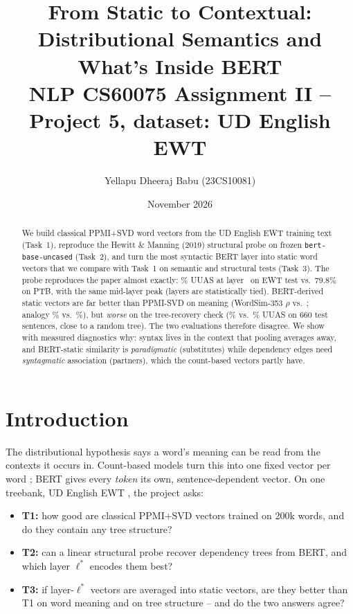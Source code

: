 \documentclass[11pt,a4paper]{article}
\title{\vspace{-1.2cm}\textbf{From Static to Contextual: Distributional Semantics and What's Inside BERT}\\[2pt]
\large NLP CS60075 Assignment II -- Project 5, dataset: UD English EWT}
\author{Yellapu Dheeraj Babu (23CS10081)}
\date{November 2026}
\newcommand{\lstar}{\ensuremath{\ell^*}}
\begin{document}
\maketitle
\vspace{-0.6cm}
\begin{abstract}
\noindent We build classical PPMI+SVD word vectors from the UD English EWT training text (Task~1), reproduce the
Hewitt \& Manning (2019) structural probe on frozen \texttt{bert-base-uncased} (Task~2), and turn the most
syntactic BERT layer into static word vectors that we compare with Task~1 on semantic and structural tests (Task~3).
The probe reproduces the paper almost exactly: \TtwoTestUuas\% UUAS at layer~\Lstar{} on EWT test vs.\ 79.8\% on PTB,
with the same mid-layer peak (layers \TiedLayers{} are statistically tied). BERT-derived static vectors are far better
than PPMI-SVD on meaning (WordSim-353 $\rho$ \TThreeWSCov{} vs.\ \TOneWSCov; analogy \TThreeANCov\% vs.\ \TOneANCov\%),
but \emph{worse} on the tree-recovery check (\TThreePool\% vs.\ \TOnePool\% UUAS on 660 test sentences, close to a random tree).
The two evaluations therefore disagree. We show with measured diagnostics why: syntax lives in the context that pooling
averages away, and BERT-static similarity is \emph{paradigmatic} (substitutes) while dependency edges need \emph{syntagmatic}
association (partners), which the count-based vectors partly have.
\end{abstract}

\section{Introduction}
The distributional hypothesis \citep{harris} says a word's meaning can be read from the contexts it occurs in. Count-based models turn
this into one fixed vector per word \citep{levy2014,levy2015}; BERT \citep{devlin} gives every \emph{token} its own, sentence-dependent
vector. On one treebank, UD English EWT \citep{silveira,ud}, the project asks:
\begin{itemize}
\item \textbf{T1:} how good are classical PPMI+SVD vectors trained on 200k words, and do they contain any tree structure?
\item \textbf{T2:} can a linear structural probe recover dependency trees from BERT, and which layer \lstar{} encodes them best?
\item \textbf{T3:} if layer-\lstar{} vectors are averaged into static vectors, are they better than T1 on word meaning and on tree
structure -- and do the two answers agree?
\end{itemize}
\end{document}
